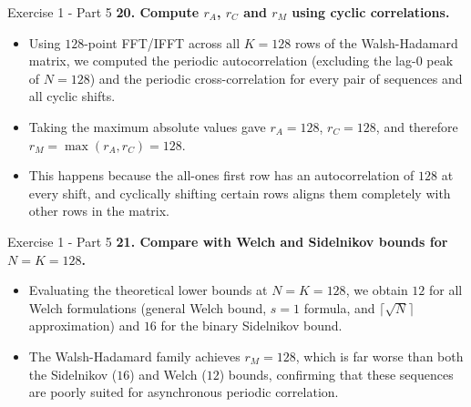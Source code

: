 \documentclass[10pt, aspectratio=169]{beamer}
\newcommand{\question}[1]{{\color{QuestionRed}\textbf{#1}}}
\begin{document}
	\begin{frame}{Exercise 1 - Part 5}
		\question{20. Compute $r_A$, $r_C$ and $r_M$ using cyclic correlations.}
		
		\vspace{0.1cm}
		\begin{itemize}
			\item Using $128$-point FFT/IFFT across all $K = 128$ rows of the Walsh-Hadamard matrix, we computed the periodic autocorrelation (excluding the lag-$0$ peak of $N = 128$) and the periodic cross-correlation for every pair of sequences and all cyclic shifts.
			\item Taking the maximum absolute values gave $r_A = 128$, $r_C = 128$, and therefore $r_M = \max(r_A, r_C) = 128$.
			\item This happens because the all-ones first row has an autocorrelation of $128$ at every shift, and cyclically shifting certain rows aligns them completely with other rows in the matrix.
		\end{itemize}
		
	\end{frame}
	
	\begin{frame}{Exercise 1 - Part 5}
		\question{21. Compare with Welch and Sidelnikov bounds for $N = K = 128$.}
		
		\vspace{0.1cm}
		\begin{itemize}
			\item Evaluating the theoretical lower bounds at $N = K = 128$, we obtain $12$ for all Welch formulations (general Welch bound, $s = 1$ formula, and $\lceil\sqrt{N}\rceil$ approximation) and $16$ for the binary Sidelnikov bound.
			\item The Walsh-Hadamard family achieves $r_M = 128$, which is far worse than both the Sidelnikov ($16$) and Welch ($12$) bounds, confirming that these sequences are poorly suited for asynchronous periodic correlation.
		\end{itemize}
		
	\end{frame}
	
\end{document}

